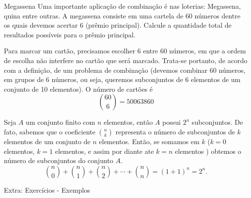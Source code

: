 \begin{frame}
\begin{exem}{Megassena}
Uma importante aplicação de combinação  é nas loterias:
Megassena, quina entre outras. A megassena consiste em uma cartela de 60
números dentre os quais devemos acertar 6 (prêmio principal). Calcule a
quantidade total de resultados possíveis para o prêmio principal.

Para marcar um cartão, precisamos escolher 6 entre 60 números, em que a
ordem de escolha não interfere no cartão que será marcado. Trata-se portanto, de
acordo com a definição, de um problema de combinação (devemos
combinar 60 números, em grupos de 6 números, ou seja, queremos subconjuntos
de 6 elementos de um conjunto de 10 elementos). O número de cartões é 
$$\displaystyle
{60 \choose 6} = 50063860
$$

\end{exem}

\begin{exem}
Seja $A$ um conjunto finito com $n$ elementos, então $A$ possui $2^n$ subconjuntos. De fato, sabemos que o coeficiente  
$\displaystyle{{n \choose k}}$ representa o número de subconjuntos de $k$ elementos de um conjunto de $n$ elementos. 
Então, se somamos em $k$ ($k=0$ elementos, $k=1$ elementos, e assim por diante ate $k=n$ elementos ) obtemos o número de subconjuntos do conjunto $A$. 
$$
{n \choose 0} + {n \choose 1} + {n \choose 2} + \cdots + {n \choose n} = (1+1)^n = 2^n.
$$
\end{exem}

\end{frame}



\begin{frame}
\vspace{4cm}
\begin{block}{Extra: Exercícios - Exemplos }
	{}
\end{block}
\end{frame}


